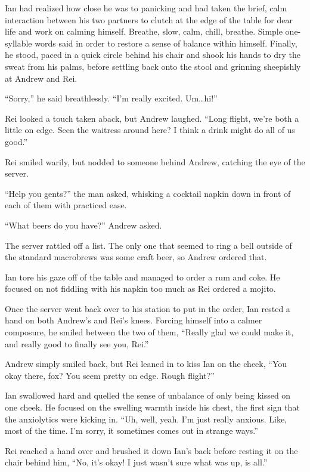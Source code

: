 Ian had realized how close he was to panicking and had taken the brief, calm interaction between his two partners to clutch at the edge of the table for dear life and work on calming himself. Breathe, slow, calm, chill, breathe. Simple one-syllable words said in order to restore a sense of balance within himself. Finally, he stood, paced in a quick circle behind his chair and shook his hands to dry the sweat from his palms, before settling back onto the stool and grinning sheepishly at Andrew and Rei.

``Sorry,'' he said breathlessly. ``I'm really excited. Um\ldots{}hi!''

Rei looked a touch taken aback, but Andrew laughed. ``Long flight, we're both a little on edge. Seen the waitress around here? I think a drink might do all of us good.''

Rei smiled warily, but nodded to someone behind Andrew, catching the eye of the server.

``Help you gents?'' the man asked, whisking a cocktail napkin down in front of each of them with practiced ease.

``What beers do you have?'' Andrew asked.

The server rattled off a list. The only one that seemed to ring a bell outside of the standard macrobrews was some craft beer, so Andrew ordered that.

Ian tore his gaze off of the table and managed to order a rum and coke. He focused on not fiddling with his napkin too much as Rei ordered a mojito.

Once the server went back over to his station to put in the order, Ian rested a hand on both Andrew's and Rei's knees. Forcing himself into a calmer composure, he smiled between the two of them, ``Really glad we could make it, and really good to finally see you, Rei.''

Andrew simply smiled back, but Rei leaned in to kiss Ian on the cheek, ``You okay there, fox? You seem pretty on edge. Rough flight?''

Ian swallowed hard and quelled the sense of unbalance of only being kissed on one cheek. He focused on the swelling warmth inside his chest, the first sign that the anxiolytics were kicking in. ``Uh, well, yeah. I'm just really anxious. Like, most of the time. I'm sorry, it sometimes comes out in strange ways.''

Rei reached a hand over and brushed it down Ian's back before resting it on the chair behind him, ``No, it's okay! I just wasn't sure what was up, is all.''


